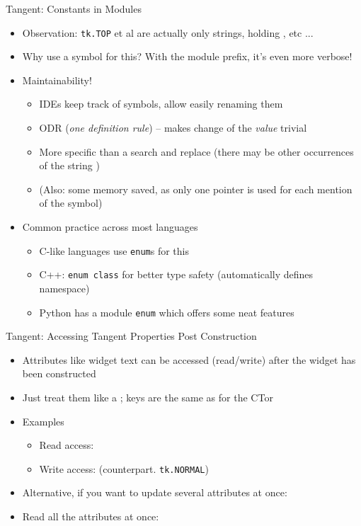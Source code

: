 
\begin{frame}{Tangent: Constants in Modules}
%
\begin{itemize}
\item Observation: \texttt{tk.TOP} et al are actually only strings, holding , etc ...
\item Why use a symbol for this? With the module prefix, it's even more verbose!
\item Maintainability!
	\begin{itemize}
	 \item IDEs keep track of symbols, allow easily renaming them
	 \item ODR (\emph{one definition rule}) -- makes change of the \emph{value} trivial
	 \item More specific than a search and replace (there may be other occurrences of the string )
	 \item (Also: some memory saved, as only one pointer is used for each mention of the symbol)
	 \end{itemize} 
\item Common practice across most languages
	\begin{itemize}
	\item C-like languages use \texttt{enum}s for this
	\item C++: \texttt{enum class} for better type safety (\zB automatically defines namespace)
	\item Python has a module \texttt{enum} which offers some neat features
	\end{itemize}
\end{itemize}
%
\end{frame}


\begin{frame}[fragile]{Tangent: Accessing Tangent Properties Post Construction}
%
\begin{itemize}
\item Attributes like widget text can be accessed (read/write) after the widget has been constructed
\item Just treat them like a ; keys are the same as for the CTor
\item Examples
	\begin{itemize}
	\item Read access: 
	\item Write access:  (counterpart. \texttt{tk.NORMAL})
	\end{itemize}
\item Alternative, if you want to update several attributes at once: 
\item Read all the attributes at once: 
\end{itemize}
%
\end{frame}

